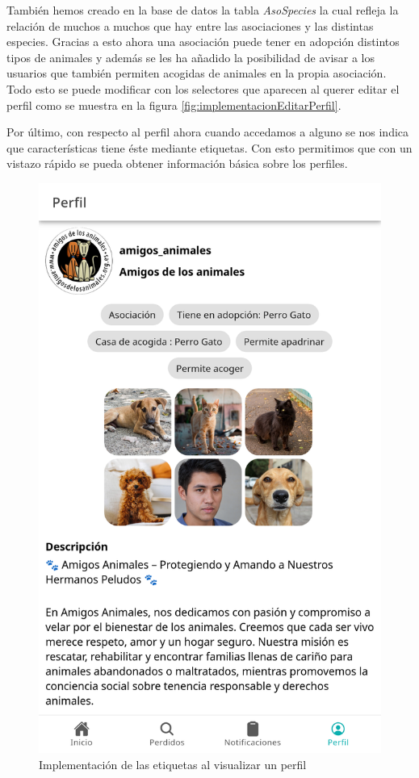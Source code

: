 También hemos creado en la base de datos la tabla \textit{AsoSpecies} la cual refleja la relación de muchos a muchos que hay entre las asociaciones y las distintas especies. Gracias a esto ahora una asociación puede tener en adopción distintos tipos de animales y además se les ha añadido la posibilidad de avisar a los usuarios que también permiten acogidas de animales en la propia  asociación. Todo esto se puede modificar con los selectores que aparecen al querer editar el perfil como se muestra en la figura \ref{fig:implementacionEditarPerfil}.

Por último, con respecto al perfil ahora cuando accedamos a alguno se nos indica que características tiene éste mediante etiquetas. Con esto permitimos que con un vistazo rápido se pueda obtener información básica sobre los perfiles.

\begin{figure}[H]
	\centering
	\includegraphics[width=0.5\linewidth]{"sprint 4/etiquetasPerfil"}
	\caption{Implementación de las etiquetas al  visualizar un perfil}
	\label{fig:etiquetasperfil}
\end{figure}

